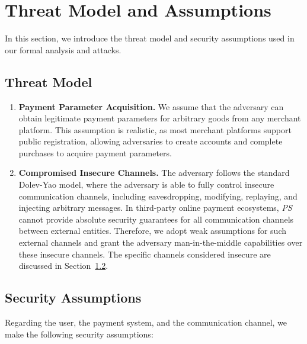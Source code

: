 \section{Threat Model and Assumptions}

In this section, we introduce the threat model and security assumptions used in our formal analysis and attacks.

\subsection{Threat Model}

\begin{enumerate}[leftmargin=*]
  \item \textbf{Payment Parameter Acquisition.}
  We assume that the adversary can obtain legitimate payment parameters for arbitrary goods from any merchant platform.
  This assumption is realistic, as most merchant platforms support public registration, allowing adversaries to create accounts and complete purchases to acquire payment parameters.
  \item \textbf{Compromised Insecure Channels.}
  The adversary follows the standard Dolev-Yao model, where the adversary is able to fully control insecure communication channels, including eavesdropping, modifying, replaying, and injecting arbitrary messages.
  In third-party online payment ecosystems, \emph{PS} cannot provide absolute security guarantees for all communication channels between external entities. 
  Therefore, we adopt weak assumptions for such external channels and grant the adversary man-in-the-middle capabilities over these insecure channels. 
  The specific channels considered insecure are discussed in Section~\ref{sec:security_assumptions}.
\end{enumerate}



\subsection{Security Assumptions} \label{sec:security_assumptions}

Regarding the user, the payment system, and the communication channel, we make the following security assumptions:

